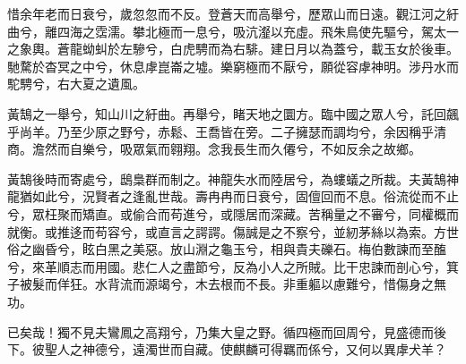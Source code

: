 
\begin{pinyinscope}
惜余年老而日衰兮，歲忽忽而不反。登蒼天而高舉兮，歷眾山而日遠。觀江河之紆曲兮，離四海之霑濡。攀北極而一息兮，吸沆瀣以充虛。飛朱鳥使先驅兮，駕太一之象輿。蒼龍蚴虯於左驂兮，白虎騁而為右騑。建日月以為蓋兮，載玉女於後車。馳騖於杳冥之中兮，休息虖崑崙之墟。樂窮極而不厭兮，願從容虖神明。涉丹水而駝騁兮，右大夏之遺風。

黃鵠之一舉兮，知山川之紆曲。再舉兮，睹天地之圜方。臨中國之眾人兮，託回飆乎尚羊。乃至少原之野兮，赤鬆、王喬皆在旁。二子擁瑟而調均兮，余因稱乎清商。澹然而自樂兮，吸眾氣而翱翔。念我長生而久僊兮，不如反余之故鄉。

黃鵠後時而寄處兮，鴟梟群而制之。神龍失水而陸居兮，為螻蟻之所裁。夫黃鵠神龍猶如此兮，況賢者之逢亂世哉。壽冉冉而日衰兮，固儃回而不息。俗流從而不止兮，眾枉聚而矯直。或偷合而苟進兮，或隱居而深藏。苦稱量之不審兮，同權概而就衡。或推迻而苟容兮，或直言之諤諤。傷誠是之不察兮，並紉茅絲以為索。方世俗之幽昏兮，眩白黑之美惡。放山淵之龜玉兮，相與貴夫礫石。梅伯數諫而至醢兮，來革順志而用國。悲仁人之盡節兮，反為小人之所賊。比干忠諫而剖心兮，箕子被髮而佯狂。水背流而源竭兮，木去根而不長。非重軀以慮難兮，惜傷身之無功。

已矣哉！獨不見夫鸞鳳之高翔兮，乃集大皇之野。循四極而回周兮，見盛德而後下。彼聖人之神德兮，遠濁世而自藏。使麒麟可得羈而係兮，又何以異虖犬羊？


\end{pinyinscope}
